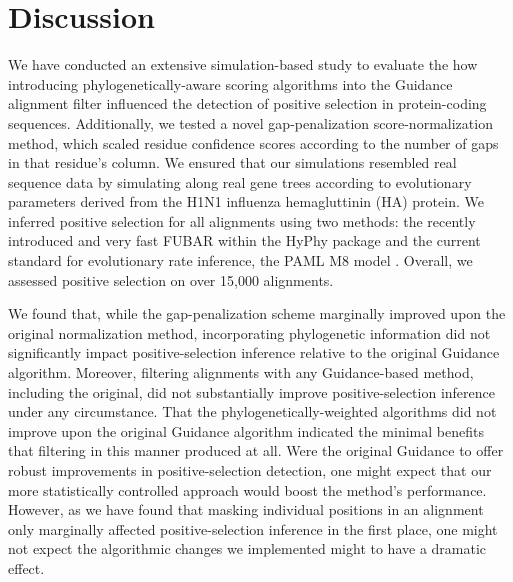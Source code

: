 \documentclass[10pt]{article}
\begin{document}



\section*{Discussion}

We have conducted an extensive simulation-based study to evaluate the how introducing phylogenetically-aware scoring algorithms into the Guidance alignment filter influenced the detection of positive selection in protein-coding sequences. Additionally, we tested a novel gap-penalization score-normalization method, which scaled residue confidence scores according to the number of gaps in that residue's column. We ensured that our simulations resembled real sequence data by simulating along real gene trees according to evolutionary parameters derived from the H1N1 influenza hemagluttinin (HA) protein. We inferred positive selection for all alignments using two methods: the recently introduced and very fast FUBAR \citep{Murrell2013} within the HyPhy package \citep{Pond2005} and the current standard for evolutionary rate inference, the PAML M8 model \citep{Yang2007}. Overall, we assessed positive selection on over 15,000 alignments.

We found that, while the gap-penalization scheme marginally improved upon the original normalization method, incorporating phylogenetic information did not significantly impact positive-selection inference relative to the original Guidance algorithm. Moreover, filtering alignments with any Guidance-based method, including the original, did not substantially improve positive-selection inference under any circumstance. That the phylogenetically-weighted algorithms did not improve upon the original Guidance algorithm indicated the minimal benefits that filtering in this manner produced at all. Were the original Guidance to offer robust improvements in positive-selection detection, one might expect that our more statistically controlled approach would boost the method's performance. However, as we have found that masking individual positions in an alignment only marginally affected positive-selection inference in the first place, one might not expect the algorithmic changes we implemented might to have a dramatic effect.
\end{document}
